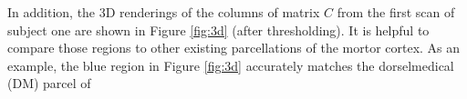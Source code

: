 \documentclass[fleqn,12pt]{article}
\let\oldref\ref
\renewcommand{\ref}[1]{(\oldref{#1})}
\begin{document}
In addition, the 3D renderings of the columns of matrix $C$ from the first scan of subject one are shown in Figure \oldref{fig:3d} (after thresholding).
It is helpful to compare those regions to other existing parcellations of the mortor cortex. As an example, the blue region in Figure \oldref{fig:3d} accurately matches the dorselmedical (DM) parcel of
\end{document}
